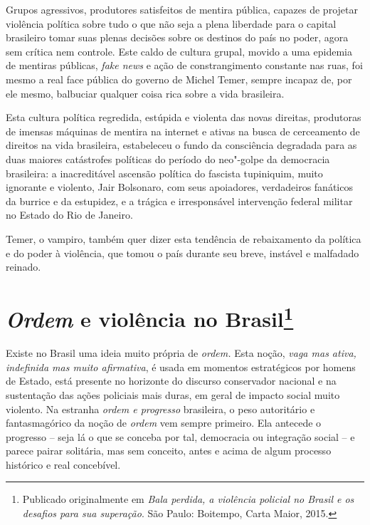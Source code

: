 Grupos agressivos, produtores satisfeitos de mentira pública, capazes de
projetar violência política sobre tudo o que não seja a plena liberdade
para o capital brasileiro tomar suas plenas decisões sobre os destinos
do país no poder, agora sem crítica nem controle. Este caldo de cultura
grupal, movido a uma epidemia de mentiras públicas, \emph{fake news} e
ação de constrangimento constante nas ruas, foi mesmo a real face
pública do governo de Michel Temer, sempre incapaz de, por ele mesmo,
balbuciar qualquer coisa rica sobre a vida brasileira.

Esta cultura política regredida, estúpida e violenta das novas
direitas, produtoras de imensas máquinas de mentira na internet e ativas
na busca de cerceamento de direitos na vida brasileira, estabeleceu o
fundo da consciência degradada para as duas maiores catástrofes
políticas do período do neo"-golpe da democracia brasileira: a
inacreditável ascensão política do fascista tupiniquim, muito ignorante
e violento, Jair Bolsonaro, com seus apoiadores, verdadeiros fanáticos
da burrice e da estupidez, e a trágica e irresponsável intervenção
federal militar no Estado do Rio de Janeiro.

Temer, o vampiro, também quer dizer esta tendência de rebaixamento da
política e do poder à violência, que tomou o país durante seu breve,
instável e malfadado reinado.

\chapter{\emph{Ordem} e violência no Brasil\footnote{Publicado
  originalmente em \emph{Bala perdida, a violência policial no Brasil e
  os desafios para sua superação}. São Paulo: Boitempo, Carta Maior,
  2015.}}

Existe no Brasil uma ideia muito própria de \emph{ordem.} Esta
noção, \emph{vaga mas ativa, indefinida mas muito afirmativa}, é usada
em momentos estratégicos por homens de Estado, está presente no
horizonte do discurso conservador nacional e na sustentação das ações
policiais mais duras, em geral de impacto social muito violento. Na
estranha \emph{ordem e progresso} brasileira, o peso autoritário e
fantasmagórico da noção de \emph{ordem} vem sempre primeiro. Ela
antecede o progresso -- seja lá o que se conceba por tal, democracia ou
integração social -- e parece pairar solitária, mas sem conceito, antes
e acima de algum processo histórico e real concebível.

